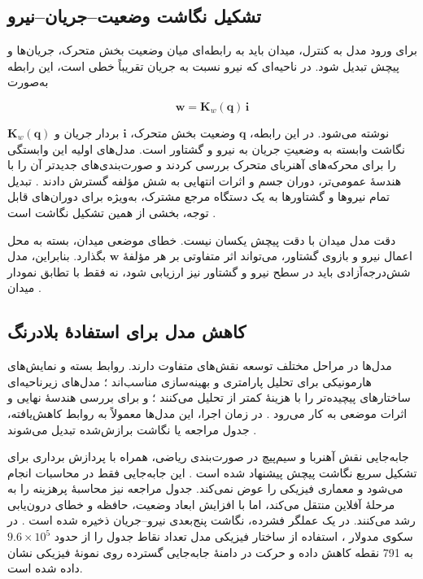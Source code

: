 \subsection{تشکیل نگاشت وضعیت--جریان--نیرو}
\label{subsec:field_to_wrench}

برای ورود مدل به کنترل، میدان باید به رابطه‌ای میان وضعیت بخش متحرک، جریان‌ها و پیچش تبدیل شود. در ناحیه‌ای که نیرو نسبت به جریان تقریباً خطی است، این رابطه به‌صورت

\begin{equation}
	\mathbf{w}
	=
	\mathbf{K}_{w}(\mathbf{q})\,\mathbf{i}
	\label{eq:wrench_current_mapping}
\end{equation}

نوشته می‌شود. در این رابطه، $\mathbf{q}$ وضعیت بخش متحرک، $\mathbf{i}$ بردار جریان و $\mathbf{K}_{w}(\mathbf{q})$ نگاشت وابسته به وضعیتِ جریان به نیرو و گشتاور است. مدل‌های اولیه این وابستگی را برای محرکه‌های آهنربای متحرک بررسی کردند \cite{jansenModelingMagneticallyLevitated2007} و صورت‌بندی‌های جدیدتر آن را با هندسهٔ عمومی‌تر، دوران جسم و اثرات انتهایی به شش مؤلفه گسترش دادند \cite{hu6DOFExtendedUnified2024}. تبدیل تمام نیروها و گشتاورها به یک دستگاه مرجع مشترک، به‌ویژه برای دوران‌های قابل توجه، بخشی از همین تشکیل نگاشت است \cite{huDynamicModelingApproach2025}.

دقت مدل میدان با دقت پیچش یکسان نیست. خطای موضعی میدان، بسته به محل اعمال نیرو و بازوی گشتاور، می‌تواند اثر متفاوتی بر هر مؤلفهٔ $\mathbf{w}$ بگذارد. بنابراین، مدل شش‌درجه‌آزادی باید در سطح نیرو و گشتاور نیز ارزیابی شود، نه فقط با تطابق نمودار میدان \cite{hu6DOFExtendedUnified2024}.

\subsection{کاهش مدل برای استفادهٔ بلادرنگ}
\label{subsec:modeling_for_design_control}

مدل‌ها در مراحل مختلف توسعه نقش‌های متفاوت دارند. روابط بسته و نمایش‌های هارمونیکی برای تحلیل پارامتری و بهینه‌سازی مناسب‌اند \cite{akoun3DAnalyticalCalculation1984,wangMagnetArrayPlanar2020}؛ مدل‌های زیرناحیه‌ای ساختارهای پیچیده‌تر را با هزینهٔ کمتر از  تحلیل می‌کنند \cite{liElectromagneticAnalysisAxialflux2024}؛ و  برای بررسی هندسهٔ نهایی و اثرات موضعی به کار می‌رود \cite{liFiniteElementModeling2025}. در زمان اجرا، این مدل‌ها معمولاً به روابط کاهش‌یافته، جدول مراجعه یا نگاشت برازش‌شده تبدیل می‌شوند \cite{jeroendeboeijLookUpTableBased2007,hu6DOFExtendedUnified2024}.

جابه‌جایی نقش آهنربا و سیم‌پیچ در صورت‌بندی ریاضی، همراه با پردازش برداری برای تشکیل سریع نگاشت پیچش پیشنهاد شده است \cite{wangMagnetcoilRoleswitchingRealtime2024}. این جابه‌جایی فقط در محاسبات انجام می‌شود و معماری فیزیکی را عوض نمی‌کند. جدول مراجعه نیز محاسبهٔ پرهزینه را به مرحلهٔ آفلاین منتقل می‌کند، اما با افزایش ابعاد وضعیت، حافظه و خطای درون‌یابی رشد می‌کنند. در یک عملگر فشرده، نگاشت پنج‌بعدی نیرو--جریان ذخیره شده است \cite{trakarnchaiyoDesignCompactPlanar2023}. در سکوی مدولار \cite{xuModularMaglevDesign2024d}، استفاده از ساختار فیزیکی مدل تعداد نقاط جدول را از حدود \(9.6\times10^{5}\) به 791 نقطه کاهش داده و حرکت در دامنهٔ جابه‌جایی گسترده روی نمونهٔ فیزیکی نشان داده شده است.

